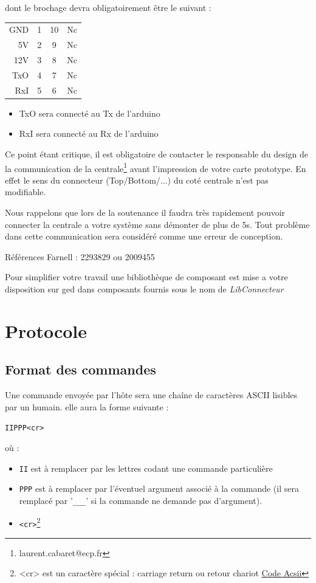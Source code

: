 \documentclass[a4paper, 10pt]{article} %
\begin{document}
dont le brochage devra obligatoirement être le suivant :

\begin{center}
\begin{tabular}{r|c||c|l}
GND&1&10&Nc\\
5V&2&9&Nc\\
12V&3&8&Nc\\
TxO&4&7&Nc\\
RxI&5&6&Nc\\
\end{tabular}
\end{center}


\begin{itemize}
\item TxO sera connecté au Tx de l'arduino
\item RxI sera connecté au Rx de l'arduino
\end{itemize}


Ce point étant critique, il est obligatoire de contacter le responsable du design de la communication de la centrale\footnote{laurent.cabaret@ecp.fr} avant l'impression  de votre carte prototype.
En effet le sens du connecteur (Top/Bottom/...) du coté centrale n'est pas modifiable.

Nous rappelons que lors de la soutenance il faudra très rapidement pouvoir connecter la centrale a votre système sans démonter de plus de 5s. Tout problème dans cette communication sera considéré comme une erreur de conception.

Références Farnell : 2293829 ou 2009455

Pour simplifier votre travail une bibliothèque de composant est mise a votre disposition sur ged dans composants fournis sous le nom de \emph{LibConnecteur}

\section{Protocole}

\subsection{Format des commandes}

Une commande envoyée par l'hôte sera une chaîne de caractères ASCII lisibles par un humain. elle aura la
forme suivante :
\begin{center}
  \verb|IIPPP<cr>|
\end{center}

où :
\begin{itemize}
  \item \verb|II| est à remplacer par les lettres codant une commande particulière
  \item \verb|PPP| est à remplacer par l'éventuel argument associé à la commande (il sera remplacé par '\verb|___|' si
    la commande ne demande pas d'argument).
  \item \verb|<cr>|\footnote{<cr> est un caractère spécial : carriage return ou retour chariot \href{http://fr.wikipedia.org/wiki/American_Standard_Code_for_Information_Interchange}{Code Acsii}}
\end{itemize}
\end{document}
